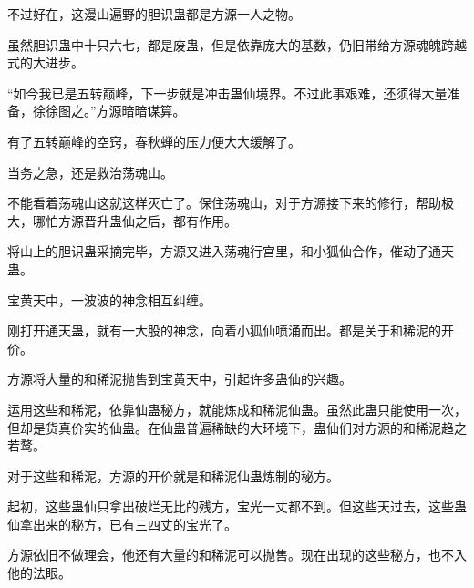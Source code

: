 \begin{this_body}
不过好在，这漫山遍野的胆识蛊都是方源一人之物。

虽然胆识蛊中十只六七，都是废蛊，但是依靠庞大的基数，仍旧带给方源魂魄跨越式的大进步。

“如今我已是五转巅峰，下一步就是冲击蛊仙境界。不过此事艰难，还须得大量准备，徐徐图之。”方源暗暗谋算。

有了五转巅峰的空窍，春秋蝉的压力便大大缓解了。

当务之急，还是救治荡魂山。

不能看着荡魂山这就这样灭亡了。保住荡魂山，对于方源接下来的修行，帮助极大，哪怕方源晋升蛊仙之后，都有作用。

将山上的胆识蛊采摘完毕，方源又进入荡魂行宫里，和小狐仙合作，催动了通天蛊。

宝黄天中，一波波的神念相互纠缠。

刚打开通天蛊，就有一大股的神念，向着小狐仙喷涌而出。都是关于和稀泥的开价。

方源将大量的和稀泥抛售到宝黄天中，引起许多蛊仙的兴趣。

运用这些和稀泥，依靠仙蛊秘方，就能炼成和稀泥仙蛊。虽然此蛊只能使用一次，但却是货真价实的仙蛊。在仙蛊普遍稀缺的大环境下，蛊仙们对方源的和稀泥趋之若鹜。

对于这些和稀泥，方源的开价就是和稀泥仙蛊炼制的秘方。

起初，这些蛊仙只拿出破烂无比的残方，宝光一丈都不到。但这些天过去，这些蛊仙拿出来的秘方，已有三四丈的宝光了。

方源依旧不做理会，他还有大量的和稀泥可以抛售。现在出现的这些秘方，也不入他的法眼。

\end{this_body}

